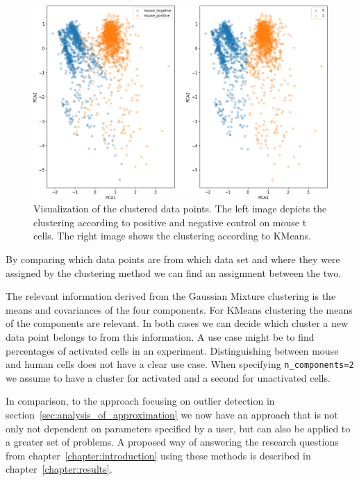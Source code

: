 \begin{figure}
	\centering
	\includegraphics[width=\textwidth]{fig/separate_mouse_kmeans}
	
	\caption{Visualization of the clustered data points. The left image depicts the clustering according to positive and negative control on mouse t cells. The right image shows the clustering according to KMeans.}
	\label{fig:vis_output_seperate_mouse_kmeans}
\end{figure}

By comparing which data points are from which data set and where they were assigned by the clustering method we can find an assignment between the two.

The relevant information derived from the Gaussian Mixture clustering is the means and covariances of the four components. For KMeans clustering the means of the components are relevant. In both cases we can decide which cluster a new data point belongs to from this information. A use case might be to find percentages of activated cells in an experiment. Distinguishing between mouse and human cells does not have a clear use case. When specifying \texttt{n\_components=2} we assume to have a cluster for activated and a second for unactivated cells.

In comparison, to the approach focusing on outlier detection in section~\ref{sec:analysis_of_approximation} we now have an approach that is not only not dependent on parameters specified by a user, but can also be applied to a greater set of problems. A proposed way of answering the research questions from chapter~\ref{chapter:introduction} using these methods is described in chapter~\ref{chapter:results}.